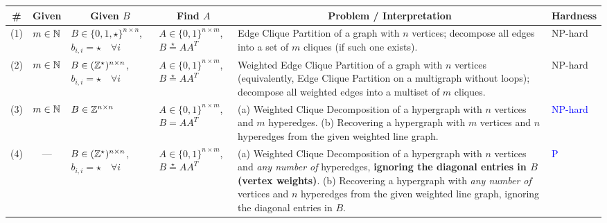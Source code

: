 \begin{table*}[ht]
  \centering
  \small

  \begin{tabular}{|c|c|p{}|p{}|p{}|p{}|}
    \hline
    \#
    &Given
    &\multicolumn{1}{c|}{Given $B$} 
    &\multicolumn{1}{c|}{Find $A$} 
    &\multicolumn{1}{c|}{Problem / Interpretation}
    &\multicolumn{1}{c|}{Hardness}
    \\
    \hline
    (1) & $m \in \mathbb{N}$ & $B \in \{0,1,\star \}^{n \times n}$,\newline $b_{i,i}=\star\quad\forall i$
     & $A \in \{0,1\}^{n \times m}$,\newline $B\stackrel{\star}{=}AA^T$
     & Edge Clique Partition of a graph with $n$ vertices; decompose all edges into a set of $m$ cliques (if such one exists).
     & NP-hard \cite{shaohan1988complexity}\\
    \hline
    (2) & $m \in \mathbb{N}$ & $B \in (\mathbb{Z}^\star)^{n \times n}$,\newline $b_{i,i}=\star \quad\forall i$
     & $A \in \{0,1\}^{n \times m}$,\newline $B\stackrel{\star}{=}AA^T$
     & Weighted Edge Clique Partition of a graph with $n$ vertices
     (equivalently, Edge Clique Partition on a multigraph without loops);
     decompose all weighted edges into a multiset of $m$ cliques.
     & NP-hard \cite{feldmann_fixed-parameter_2020,cooley_parameterized_2021}\\
    \hline
    (3) & $m \in \mathbb{N}$ & $B \in \mathbb{Z}^{n \times n}$
    & $A \in \{0,1\}^{n \times m}$,\newline $B=AA^T$
    & (a) Weighted Clique Decomposition of a hypergraph with $n$ vertices and $m$ hyperedges.
    (b) Recovering a hypergraph with $m$ vertices and $n$ hyperedges from the given weighted line graph.
    & \textcolor{blue}{NP-hard}\\
    \hline
    (4) & --- & $B \in (\mathbb{Z}^\star)^{n \times n}$,\newline $b_{i,i}=\star \quad\forall i$
    & $A \in \{0,1\}^{n \times m}$,\newline $B\stackrel{\star}{=}AA^T$
    & (a) Weighted Clique Decomposition of a hypergraph with $n$ vertices 
    and \textit{any number of} hyperedges, \textbf{ignoring the diagonal entries in $B$ (vertex weights)}.
    (b) Recovering a hypergraph with \textit{any number of} vertices and 
    $n$ hyperedges from the given weighted line graph, ignoring the diagonal entries in $B$.
    & \textcolor{blue}{P}\\

\end{tabular}
\end{table*}
